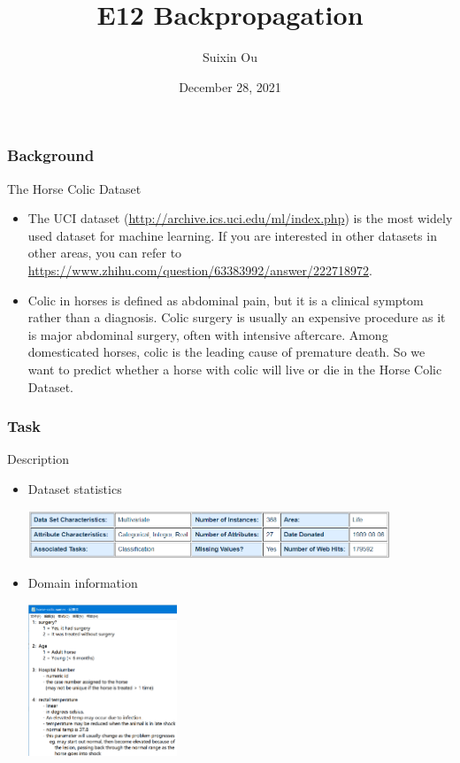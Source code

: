 \documentclass{beamer}
\title{E12 Backpropagation}
\author{Suixin Ou} %
\institute[SYSU] %
{
  School of Computer Science\\
  Sun Yat-sen University \\ %
  \medskip
}
\date{December 28, 2021} %
\begin{document}
\begin{frame}
  \titlepage
\end{frame}

\begin{frame}
  \frametitle{Background}
  \begin{block}{The Horse Colic Dataset}
    \begin{itemize}
    \item 
The UCI dataset (\url{http://archive.ics.uci.edu/ml/index.php}) is the most widely used dataset for machine learning. If you are interested in other datasets in other areas, you can refer to \url{https://www.zhihu.com/question/63383992/answer/222718972}.

    \item Colic in horses is defined as abdominal pain, but it is a clinical symptom rather than a diagnosis. Colic surgery is usually an expensive procedure as it is major abdominal surgery, often with intensive aftercare. Among domesticated horses, colic is the leading cause of premature death. So we want to predict whether a horse with colic will live or die in the Horse Colic Dataset.

    \end{itemize}
      
  \end{block}
\end{frame}


\begin{frame}
  \frametitle{Task}
  \begin{block}{Description}
	
    \begin{itemize}
      \item Dataset statistics

\includegraphics[width=0.85\textwidth]{Pic/dataset}
      \item Domain information

\includegraphics[width=0.35\textwidth]{Pic/domain}
    \end{itemize}

  \end{block}
\end{frame}
\end{document}
